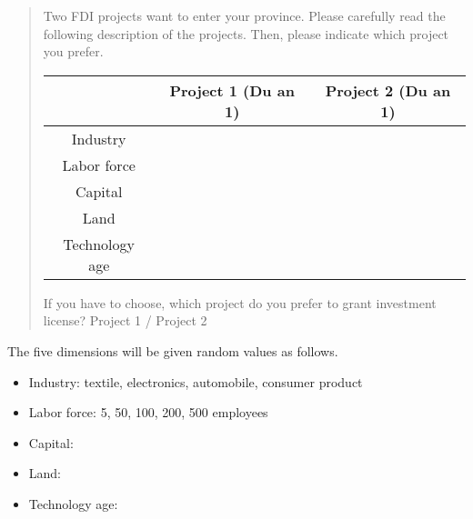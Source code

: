 \begin{quote}
Two FDI projects want to enter your province. Please carefully read the following description of the projects. Then, please indicate which project you prefer.

\begin{center}
  \begin{tabular}{ c | c | c }
    \hline
     & Project 1 (Du an 1) & Project 2 (Du an 1) \\ \hline
    Industry &  &  \\ \hline
    Labor force &  &  \\ \hline
    Capital &  &  \\ \hline
    Land &  &  \\ \hline
    Technology age &  &  \\ \hline
    \hline
  \end{tabular}
\end{center}

If you have to choose, which project do you prefer to grant investment license? Project 1 / Project 2
\end{quote}

The five dimensions will be given random values as follows.
\begin{itemize}
\item Industry: textile, electronics, automobile, consumer product
\item Labor force: 5, 50, 100, 200, 500 employees
\item Capital:
\item Land:
\item Technology age: 
\end{itemize}
